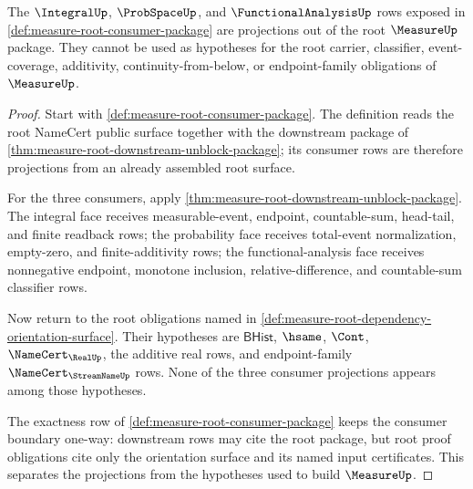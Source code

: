 \begin{theorem}
\label{thm:measure-root-consumer-projection-separation}
The $\IntegralUp$, $\ProbSpaceUp$, and $\FunctionalAnalysisUp$ rows exposed in
\autoref{def:measure-root-consumer-package} are projections out of the root
$\MeasureUp$ package. They cannot be used as hypotheses for the root carrier,
classifier, event-coverage, additivity, continuity-from-below, or
endpoint-family obligations of $\MeasureUp$.
\end{theorem}
\begin{proof}
Start with \autoref{def:measure-root-consumer-package}. The definition reads
the root NameCert public surface together with the downstream package of
\autoref{thm:measure-root-downstream-unblock-package}; its consumer rows are
therefore projections from an already assembled root surface.

For the three consumers, apply
\autoref{thm:measure-root-downstream-unblock-package}. The integral face
receives measurable-event, endpoint, countable-sum, head-tail, and finite
readback rows; the probability face receives total-event normalization,
empty-zero, and finite-additivity rows; the functional-analysis face receives
nonnegative endpoint, monotone inclusion, relative-difference, and
countable-sum classifier rows.

Now return to the root obligations named in
\autoref{def:measure-root-dependency-orientation-surface}. Their hypotheses
are $\mathsf{BHist}$, $\hsame$, $\Cont$, $\NameCert_{\RealUp}$, the additive
real rows, and endpoint-family $\NameCert_{\StreamNameUp}$ rows. None of the
three consumer projections appears among those hypotheses.

The exactness row of \autoref{def:measure-root-consumer-package} keeps the
consumer boundary one-way: downstream rows may cite the root package, but
root proof obligations cite only the orientation surface and its named input
certificates. This separates the projections from the hypotheses used to
build $\MeasureUp$.
\end{proof}

